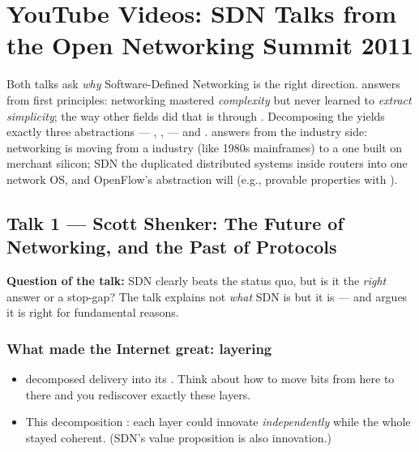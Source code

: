 \chapter{YouTube Videos: SDN Talks from the Open Networking Summit 2011}

\begin{keybox}
Both talks ask \emph{why} Software-Defined Networking is the right direction.  answers from first principles: networking mastered \emph{complexity} but never learned to \emph{extract simplicity}; the way other fields did that is through . Decomposing the  yields exactly three abstractions --- , ,  --- and .  answers from the industry side: networking is moving from a  industry (like 1980s mainframes) to a  one built on merchant silicon; SDN  the duplicated distributed systems inside routers into one network OS, and OpenFlow's  abstraction will  (e.g., provable properties with ).
\end{keybox}

\section{Talk 1 --- Scott Shenker: The Future of Networking, and the Past of Protocols}
\textbf{Question of the talk:} SDN clearly beats the status quo, but is it the \emph{right} answer or a stop-gap? The talk explains not \emph{what} SDN is but  it is --- and argues it is right for fundamental reasons.

\subsection{What made the Internet great: layering}
\begin{itemize}
\item {} decomposed delivery into its . Think about how to move bits from here to there and you rediscover exactly these layers.
\item This decomposition : each layer could innovate \emph{independently} while the whole stayed coherent. (SDN's value proposition is also innovation.)
\end{itemize}

